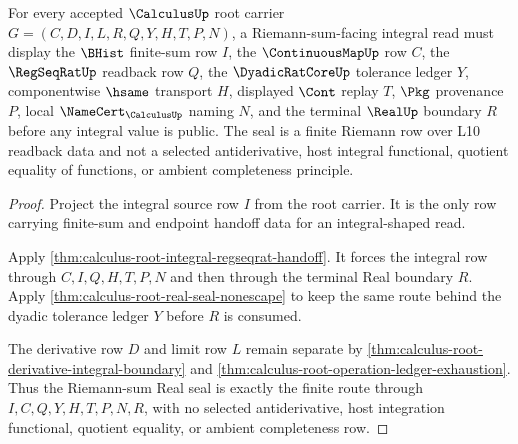 \begin{theorem}
\label{thm:calculus-root-riemann-sum-real-seal}
For every accepted $\CalculusUp$ root carrier $G=(C,D,I,L,R,Q,Y,H,T,P,N)$, a Riemann-sum-facing integral read must display the $\BHist$ finite-sum row $I$, the $\ContinuousMapUp$ row $C$, the $\RegSeqRatUp$ readback row $Q$, the $\DyadicRatCoreUp$ tolerance ledger $Y$, componentwise $\hsame$ transport $H$, displayed $\Cont$ replay $T$, $\Pkg$ provenance $P$, local $\NameCert_{\CalculusUp}$ naming $N$, and the terminal $\RealUp$ boundary $R$ before any integral value is public. The seal is a finite Riemann row over L10 readback data and not a selected antiderivative, host integral functional, quotient equality of functions, or ambient completeness principle.
\end{theorem}
\begin{proof}
Project the integral source row $I$ from the root carrier. It is the only row carrying finite-sum and endpoint handoff data for an integral-shaped read.

Apply \autoref{thm:calculus-root-integral-regseqrat-handoff}. It forces the integral row through $C,I,Q,H,T,P,N$ and then through the terminal Real boundary $R$. Apply \autoref{thm:calculus-root-real-seal-nonescape} to keep the same route behind the dyadic tolerance ledger $Y$ before $R$ is consumed.

The derivative row $D$ and limit row $L$ remain separate by \autoref{thm:calculus-root-derivative-integral-boundary} and \autoref{thm:calculus-root-operation-ledger-exhaustion}. Thus the Riemann-sum Real seal is exactly the finite route through $I,C,Q,Y,H,T,P,N,R$, with no selected antiderivative, host integration functional, quotient equality, or ambient completeness row.
\end{proof}

